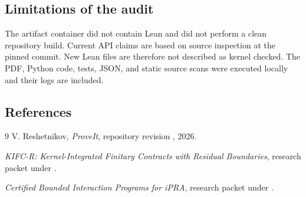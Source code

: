 \subsection{Limitations of the audit}
The artifact container did not contain Lean and did not perform a clean repository build.  Current API claims are based on source inspection at the pinned commit.  New Lean files are therefore not described as kernel checked.  The PDF, Python code, tests, JSON, and static source scans were executed locally and their logs are included.

\subsection{References}
\begin{thebibliography}{9}
V. Reshetnikov, \emph{ProveIt}, repository revision
, 2026.

\emph{KIFC-R: Kernel-Integrated Finitary Contracts with Residual Boundaries},
research packet under .

\emph{Certified Bounded Interaction Programs for iPRA},
research packet under .
\end{thebibliography}
